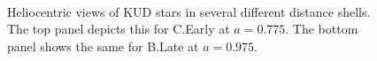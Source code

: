 \begin{figure}
    \centering
  	\\
	\caption{Heliocentric views of KUD stars in several different distance shells. The top panel depicts this for C.Early at $a=0.775$. The bottom panel shows the same for B.Late at $a=0.975$.}
\end{figure}


